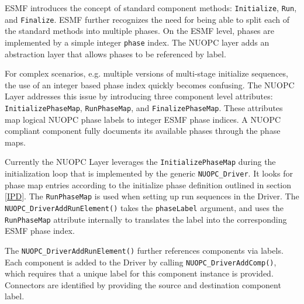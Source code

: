 %

\label{PhaseMaps}

ESMF introduces the concept of standard component methods: {\tt Initialize}, {\tt Run}, and {\tt Finalize}. ESMF further recognizes the need for being able to split each of the standard methods into multiple phases. On the ESMF level, phases are implemented by a simple integer {\tt phase} index. The NUOPC layer adds an abstraction layer that allows phases to be referenced by label.

For complex scenarios, e.g. multiple versions of multi-stage initialize sequences, the use of an integer based phase index quickly becomes confusing. The NUOPC Layer addresses this issue by introducing three component level attributes: {\tt InitializePhaseMap}, {\tt RunPhaseMap}, and {\tt FinalizePhaseMap}. These attributes map logical NUOPC phase labels to integer ESMF phase indices. A NUOPC compliant component fully documents its available phases through the phase maps.

Currently the NUOPC Layer leverages the {\tt InitializePhaseMap} during the initialization loop that is implemented by the generic {\tt NUOPC\_Driver}. It looks for phase map entries according to the initialize phase definition outlined in section \ref{IPD}. The {\tt RunPhaseMap} is used when setting up run sequences in the Driver. The {\tt NUOPC\_DriverAddRunElement()} takes the {\tt phaseLabel} argument, and uses the {\tt RunPhaseMap} attribute internally to translates the label into the corresponding ESMF phase index.

The {\tt NUOPC\_DriverAddRunElement()} further references components via labels. Each component is added to the Driver by calling {\tt NUOPC\_DriverAddComp()}, which requires that a unique label for this component instance is provided. Connectors are identified by providing the source and destination component label.
